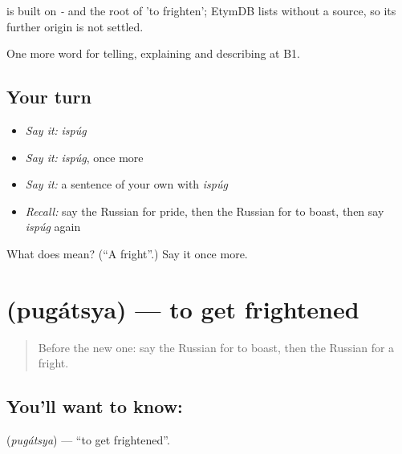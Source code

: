 \begin{cousinweb}
\emph{} is built on \emph{-} and the root of \emph{} 'to frighten'; EtymDB lists \emph{} without a source, so its further origin is not settled.
\end{cousinweb}

\begin{grammarlens}[title={What you've built}]
One more word for telling, explaining and describing at B1.
\end{grammarlens}

\subsection*{Your turn}
\begin{itemize}
\raggedright
  \item \emph{Say it:} \emph{ispúg}
  \item \emph{Say it:} \emph{ispúg}, once more
  \item \emph{Say it:} a sentence of your own with \emph{ispúg}
  \item \emph{Recall:} say the Russian for pride, then the Russian for to boast, then say \emph{ispúg} again
\end{itemize}

\begin{tcolorbox}[breakable,colback=teal!4,colframe=teal!35!black,title={Before you move on}]
What does  mean? (\textquotedblleft{}A fright\textquotedblright{}.) Say it once more.
\end{tcolorbox}
\section[\texorpdfstring{\ru{пугаться} (pugátsya)}{пугаться (pugátsya)}]{ (pugátsya) — to get frightened}

\label{lesson:RU-C476-pugatsya}



\begin{quote}
Before the new one: say the Russian for to boast, then the Russian for a fright.
\end{quote}

\subsection*{You'll want to know: }
\textbf{} (\emph{pugátsya}) — \textquotedblleft{}to get frightened\textquotedblright{}.

